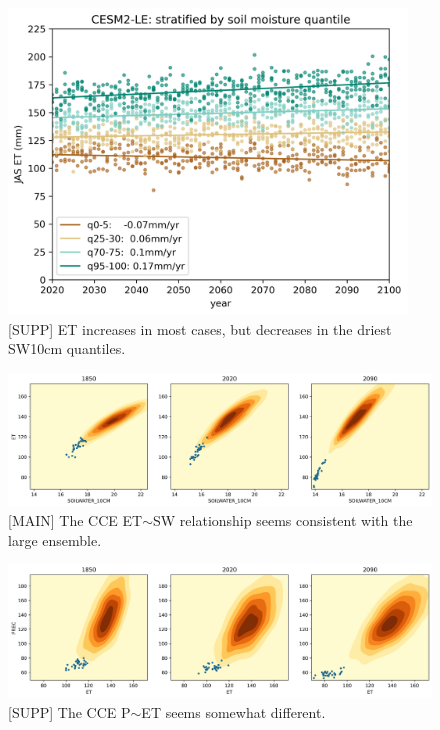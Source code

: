 \documentclass[11pt]{article}
\begin{document}
\begin{figure}[h]
\centering
\includegraphics[width=25pc]{figs/supp/et_trends.png}
\caption{[SUPP] ET increases in most cases, but decreases in the driest SW10cm quantiles.}
\label{fig:precip}
\end{figure}


\begin{figure}[h]
\centering
\includegraphics[width=40pc]{figs/contours/SOILWATER_10CM_ET_contours.png}
\caption{[MAIN] The CCE ET$\sim$SW relationship seems consistent with the large ensemble.}
\label{fig:precip}
\end{figure}

\begin{figure}[h]
\centering
\includegraphics[width=40pc]{figs/contours/ET_PREC_contours.png}
\caption{[SUPP] The CCE P$\sim$ET seems somewhat different.}
\label{fig:precip}
\end{figure}
\end{document}
